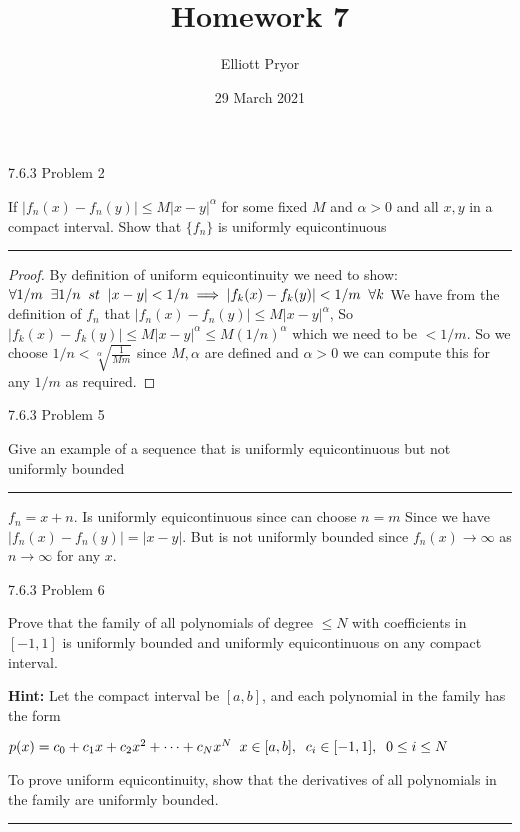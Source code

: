 \documentclass[11pt]{article}
\title{Homework 7}
\author{Elliott Pryor}
\date{29 March 2021}
\begin{document}
\maketitle

 7.6.3 Problem 2

If $|f_n(x) - f_n(y)| \leq M |x - y|^\alpha$ for some fixed $M$ and $\alpha > 0$
and all $x,y$ in a compact interval. Show that $\{f_n\}$ is uniformly
equicontinuous

\hrule

\begin{proof}
    
    By definition of uniform equicontinuity we need to show:
    $\forall 1/m \sp \exists 1/n \sp st \sp |x - y| < 1/n \implies |f_k(x) - f_k(y)| < 1/m \sp \forall k$
    We have from the definition of $f_n$ that $|f_n(x) - f_n(y)| \leq M |x - y|^\alpha$,
    So $|f_k(x) - f_k(y)| \leq M |x - y|^\alpha \leq M (1/n)^\alpha$ which we need to be $< 1/m$.
    So we choose $1/n < \sqrt[\alpha]{\frac{1}{Mm}}$ since $M, \alpha$ are defined and $\alpha > 0$
    we can compute this for any $1/m$ as required.
\end{proof}



 7.6.3 Problem 5

Give an example of a sequence that is uniformly equicontinuous 
but not uniformly bounded

\hrule

$f_n = x + n$. Is uniformly equicontinuous since can choose $n = m$
Since we have $|f_n(x) - f_n(y)| = |x - y|$. 
But is not uniformly bounded
since $f_n(x) \to \infty$ as $n \to \infty$ for any $x$.




 7.6.3 Problem 6

Prove that the family of all polynomials of degree $\leq N$ with
coefficients in $[-1,1]$ is uniformly bounded and uniformly
equicontinuous on any compact interval. 

\textbf{Hint: }
Let the compact interval be $[a, b]$, and each polynomial in the family has the form

$p(x) = c_0 + c_1 x + c_2 x^2 + \dots + c_N x^N \sp x \in [a,b], \sp c_i \in [-1, 1], \sp 0 \leq i \leq N$

To prove uniform equicontinuity, show that the derivatives of all polynomials in the 
family are uniformly bounded.

\hrule
\end{document}
